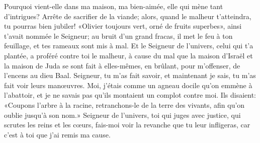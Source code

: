 Pourquoi vient-elle dans ma maison, ma bien-aimée,
	elle qui mène tant d’intrigues?
Arrête de sacrifier de la viande;
	alors, quand le malheur t’atteindra, tu pourras bien jubiler!
«Olivier toujours vert, orné de fruits superbes»,
	ainsi t’avait nommée le Seigneur;
	au bruit d’un grand fracas, il met le feu à ton feuillage,
	et tes rameaux sont mis à mal.
Et le Seigneur de l’univers, celui qui t’a plantée,
	a proféré contre toi le malheur,
	à cause du mal que la maison d’Israël et la maison de Juda se sont fait à elles-mêmes,
	en brûlant, pour m’offenser, de l’encens au dieu Baal.
Seigneur, tu m’as fait savoir, et maintenant je sais,
	tu m’as fait voir leurs manœuvres.
Moi, j’étais comme un agneau docile qu’on emmène à l’abattoir,
	et je ne savais pas qu’ils montaient un complot contre moi.
Ils disaient: «Coupons l’arbre à la racine,
	retranchons-le de la terre des vivants, afin qu’on oublie jusqu’à son nom.»
Seigneur de l’univers, toi qui juges avec justice,
	qui scrutes les reins et les cœurs,
	fais-moi voir la revanche que tu leur infligeras,
	car c’est à toi que j’ai remis ma cause.
